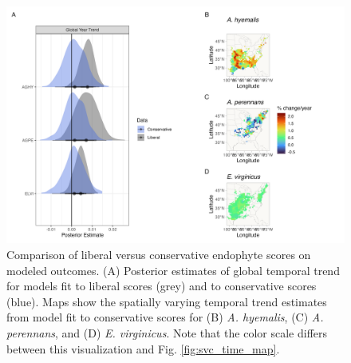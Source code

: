 \documentclass[11pt]{article}
\begin{document}
\begin{figure}[H]
	\centering
	\includegraphics[width = \linewidth]{../Plots/conservative_comparison_plot.png}
	\caption{Comparison of liberal versus conservative endophyte scores on modeled outcomes. (A) Posterior estimates of global temporal trend for models fit to liberal scores (grey) and to conservative scores (blue). Maps show the spatially varying temporal trend estimates from model fit to conservative scores for (B) \emph{A. hyemalis}, (C) \emph{A. perennans}, and (D) \emph{E. virginicus}. Note that the color scale differs between this visualization and Fig. \ref{fig:svc_time_map}.}
	\label{fig:conservative_scores_plot}
\end{figure}
\end{document}
